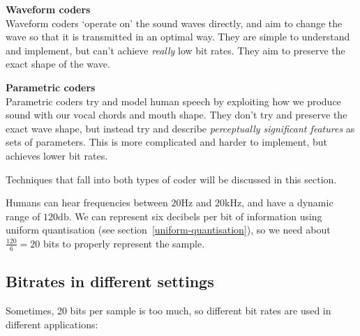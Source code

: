 \begin{description}
  \item \textbf{Waveform coders}\\
  Waveform coders `operate on' the sound waves directly, and aim to change the
  wave so that it is transmitted in an optimal way. They are simple to
  understand and implement, but can't achieve \textit{really} low bit rates.
  They aim to preserve the exact shape of the wave.

  \item \textbf{Parametric coders}\\
  Parametric coders try and model human speech by exploiting how we produce
  sound with our vocal chords and mouth shape. They don't try and preserve the
  exact wave shape, but instead try and describe \textit{perceptually
  significant features} as sets of parameters. This is more complicated and
  harder to implement, but achieves lower bit rates.
\end{description}

Techniques that fall into both types of coder will be discussed in this section.


Humans can hear frequencies between $20\si{\hertz}$ and $20\si{\kilo\hertz}$,
and have a dynamic range of $120\si{\decibel}$. We can represent six decibels
per bit of information using uniform quantisation (see
section~\ref{uniform-quantisation}), so we need about $\frac{120}{6}=20$ bits to
properly represent the sample.

\subsection{Bitrates in different settings}

Sometimes, 20 bits per sample is too much, so different bit rates are used in
different applications:

